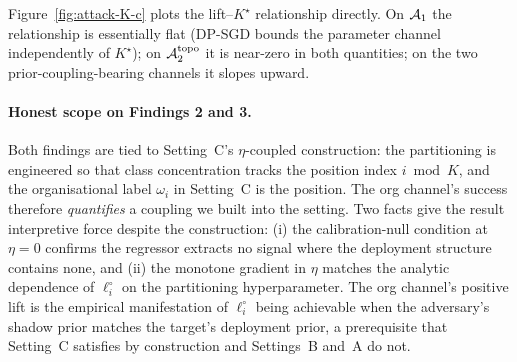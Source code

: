 Figure~\ref{fig:attack-K-c} plots the lift--$K^\star$ relationship
directly. On $\mathcal{A}_1$ the relationship is essentially flat (DP-SGD
bounds the parameter channel independently of $K^\star$);
on $\mathcal{A}_2^{\text{topo}}$ it is near-zero in both quantities; on the
two prior-coupling-bearing channels it slopes upward.

\paragraph{Honest scope on Findings 2 and 3.}
Both findings are tied to Setting~C's $\eta$-coupled construction:
the partitioning is engineered so that class concentration tracks the
position index $i \bmod K$, and the organisational label $\omega_i$
in Setting~C is the position. The org channel's success therefore
\emph{quantifies} a coupling we built into the setting. Two facts
give the result interpretive force despite the construction: (i) the
calibration-null condition at $\eta=0$ confirms the regressor
extracts no signal where the deployment structure contains none, and
(ii) the monotone gradient in $\eta$ matches the analytic dependence
of $\ell_i^\circ$ on the partitioning hyperparameter. The org
channel's positive lift is the empirical manifestation of
$\ell_i^\circ$ being achievable when the adversary's shadow prior
matches the target's deployment prior, a prerequisite that Setting~C
satisfies by construction and Settings~B and~A do not.

